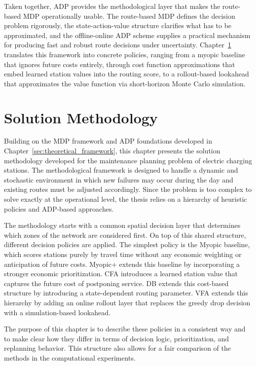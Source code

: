 \documentclass[12pt,oneside]{article}
\begin{document}
Taken together, ADP provides the methodological layer that makes the route-based MDP operationally usable. The route-based MDP defines the decision problem rigorously, the state-action-value structure clarifies what has to be approximated, and the offline-online ADP scheme supplies a practical mechanism for producing fast and robust route decisions under uncertainty. Chapter~\ref{sec:solution_methodology} translates this framework into concrete policies, ranging from a myopic baseline that ignores future costs entirely, through cost function approximations that embed learned station values into the routing score, to a rollout-based lookahead that approximates the value function via short-horizon Monte Carlo simulation.


\section{Solution Methodology}\label{sec:solution_methodology}
Building on the MDP framework and ADP foundations developed in Chapter~\ref{sec:theoretical_framework}, this chapter presents the solution methodology developed for the maintenance planning problem of electric charging stations. The methodological framework is designed to handle a dynamic and stochastic environment in which new failures may occur during the day and existing routes must be adjusted accordingly. Since the problem is too complex to solve exactly at the operational level, the thesis relies on a hierarchy of heuristic policies and ADP-based approaches.

The methodology starts with a common spatial decision layer that determines which zones of the network are considered first. On top of this shared structure, different decision policies are applied. The simplest policy is the Myopic baseline, which scores stations purely by travel time without any economic weighting or anticipation of future costs. Myopic+ extends this baseline by incorporating a stronger economic prioritization. CFA introduces a learned station value that captures the future cost of postponing service. DB extends this cost-based structure by introducing a state-dependent routing parameter. VFA extends this hierarchy by adding an online rollout layer that replaces the greedy drop decision with a simulation-based lookahead.

The purpose of this chapter is to describe these policies in a consistent way and to make clear how they differ in terms of decision logic, prioritization, and replanning behavior. This structure also allows for a fair comparison of the methods in the computational experiments.
\end{document}
